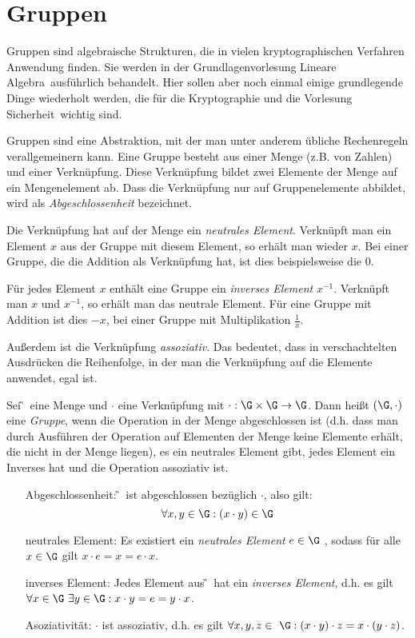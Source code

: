 
\chapter{Gruppen}
Gruppen sind algebraische Strukturen, die in vielen kryptographischen
Verfahren Anwendung finden. Sie werden in der Grundlagenvorlesung
\glqq Lineare Algebra\grqq~ausführlich behandelt. Hier sollen aber noch einmal
einige grundlegende Dinge wiederholt werden, die für die Kryptographie
und die Vorlesung \glqq Sicherheit\grqq~wichtig sind. 

Gruppen sind eine Abstraktion, mit der man unter anderem übliche
Rechenregeln verallgemeinern kann. Eine Gruppe besteht aus einer Menge
(z.B. von Zahlen) und einer Verknüpfung. Diese Verknüpfung bildet zwei
Elemente der Menge auf ein Mengenelement ab. Dass die Verknüpfung nur
auf Gruppenelemente abbildet, wird als \emph{Abgeschlossenheit}
bezeichnet.

Die Verknüpfung hat auf der Menge ein \emph{neutrales
  Element}. Verknüpft man ein Element $x$ aus der Gruppe mit diesem
Element, so erhält man wieder $x$. Bei einer Gruppe, die die Addition
als Verknüpfung hat, ist dies beispielsweise die $0$.

Für jedes Element $x$ enthält eine Gruppe ein \emph{inverses Element}
$x^{-1}$. Verknüpft man $x$ und $x^{-1}$, so erhält man das neutrale
Element. Für eine Gruppe mit Addition ist dies $-x$, bei einer Gruppe
mit Multiplikation $\frac{1}{x}$.

Außerdem ist die Verknüpfung \emph{assoziativ}. Das bedeutet, dass in
verschachtelten Ausdrücken die Reihenfolge, in der man die Verknüpfung
auf die Elemente anwendet, egal ist.

\begin{definition}[Gruppe]
Sei \G~eine Menge und $\cdot$ eine Verknüpfung mit $\cdot: \G\times \G \to
\G$. Dann heißt $(\G, \cdot)$ eine \textit{Gruppe}, wenn die Operation
in der Menge abgeschlossen ist (d.h. dass man durch Ausführen der
Operation auf Elementen der Menge keine Elemente erhält, die nicht in der
Menge liegen), es ein neutrales Element gibt, jedes 
Element ein Inverses hat und die Operation assoziativ ist.
\begin{itemize}
\item[Abgeschlossenheit:] \G~ist abgeschlossen bezüglich $\cdot$, also gilt:
  \[\forall x, y \in \G: (x\cdot y)\in \G\]
\item[neutrales Element:] Es existiert ein \textit{neutrales Element}  $e \in \G$ , sodass für
  alle $x \in \G$ gilt $x\cdot e=x=e\cdot x$.
\item[inverses Element:] Jedes Element aus \G~hat ein \textit{inverses Element}, d.h. es gilt $\forall x \in
  \G~ \exists y \in \G: x\cdot y=e=y\cdot x$.

\item[Asoziativität:] $\cdot$ ist assoziativ, d.h. es gilt $\forall x, y, z  \in ~\G:
  (x\cdot y)\cdot z = x\cdot(y \cdot z)$.
\end{itemize}
\end{definition}


